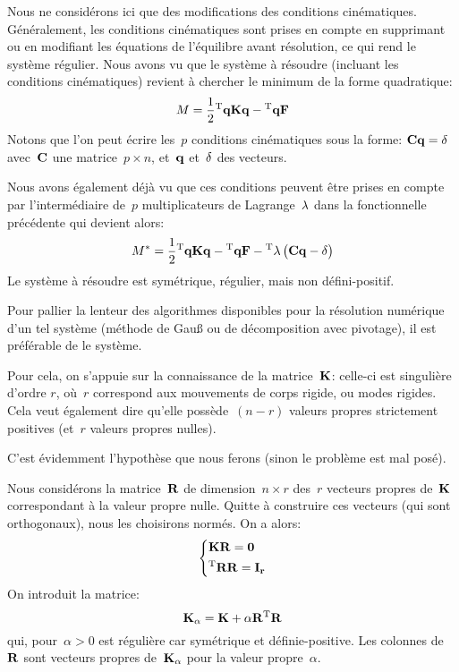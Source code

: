 Nous ne considérons ici que des modifications des conditions cinématiques. Généralement, les conditions cinématiques sont prises en compte en supprimant ou en modifiant les équations de l'équilibre avant résolution, ce qui rend le système régulier. Nous avons vu que le système à résoudre (incluant les conditions cinématiques) revient à chercher le minimum de la forme quadratique:
\begin{equation}M=\frac12 \LL{q}\MM{K}\VV{q} -\LL{q}\VV{F}\end{equation}
Notons que l'on peut écrire les~$p$ conditions cinématiques sous la forme:
$\MM{C}\VV{q} = \VV{\delta}$
avec~$\MM{C}$ une matrice~$p\times n$, et~$\VV{q}$ et~$\VV{\delta}$ des vecteurs.

Nous avons également déjà vu que ces conditions peuvent être prises en compte par l'intermédiaire de~$p$ multiplicateurs de Lagrange~$\VV{\lambda}$ dans la fonctionnelle précédente qui devient alors:
\begin{equation}
M^*=\frac12 \LL{q}\MM{K}\VV{q} -\LL{q}\VV{F} - \LL{\lambda}\PP{\MM{C}\VV{q} - \VV{\delta}}
\end{equation}
Le système à résoudre est symétrique, régulier, mais non défini-positif.

\medskip
Pour pallier la lenteur des algorithmes disponibles pour la résolution numérique d'un tel système (méthode de Gauß ou de décomposition avec pivotage), il est préférable de  le système.

Pour cela, on s'appuie sur la connaissance de la matrice~$\MM{K}$: celle-ci est singulière d'ordre $r$, où~$r$ correspond aux mouvements de corps rigide, ou modes rigides. Cela veut également dire qu'elle possède~$(n-r)$ valeurs propres strictement positives (et~$r$ valeurs propres nulles).

 C'est évidemment l'hypothèse que nous ferons (sinon le problème est mal posé).

\medskip
Nous considérons la matrice~$\MM{R}$ de dimension~$n\times r$ des~$r$ vecteurs propres de~$\MM{K}$ correspondant à la valeur propre nulle. Quitte à construire ces vecteurs (qui sont orthogonaux), nous les choisirons normés. On a alors:
\begin{equation}
\left\{
\begin{aligned}
&\MM{K}\MM{R}=\MM{0}\\
&\MMT{R}\MM{R}=\MM{I_r}
\end{aligned}
\right.
\end{equation}
On introduit la matrice:
\begin{equation} \MM{K_\alpha} = \MM{K}+\alpha \MM{R}\MMT{R} \end{equation}
qui, pour~$\alpha>0$ est régulière car symétrique et définie-positive.
Les colonnes de~$\MM{R}$ sont vecteurs propres de~$\MM{K_\alpha}$ pour la valeur propre~$\alpha$.

